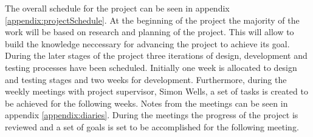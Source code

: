 The overall schedule for the project can be seen in appendix \ref{appendix:projectSchedule}. At the beginning of the project the majority of the work will be based on research and planning of the project. This will allow to build the knowledge neccessary for advancing the project to achieve its goal. During the later stages of the project three iterations of design, development and testing processes have been scheduled. Initially one week is allocated to design and testing stages and two weeks for development. Furthermore, during the weekly meetings with project supervisor, Simon Wells, a set of tasks is created to be achieved for the following weeks. Notes from the meetings can be seen in appendix \ref{appendix:diaries}. During the meetings the progress of the project is reviewed and a set of goals is set to be accomplished for the following meeting. 
